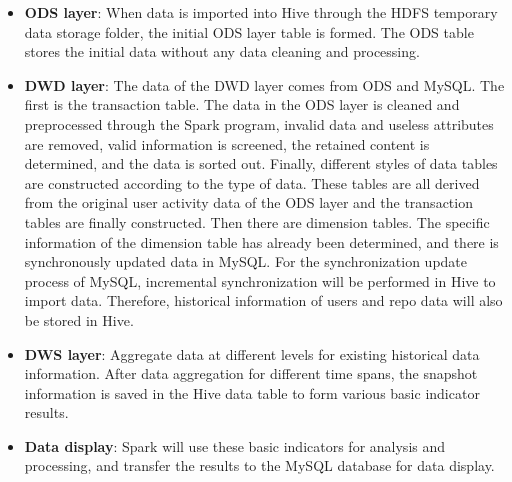 \begin{itemize}
    \item \textbf{ODS layer}: When data is imported into Hive through the HDFS temporary data storage folder, the initial ODS layer table is formed. The ODS table stores the initial data without any data cleaning and processing.
    \item \textbf{DWD layer}: The data of the DWD layer comes from ODS and MySQL. The first is the transaction table. The data in the ODS layer is cleaned and preprocessed through the Spark program, invalid data and useless attributes are removed, valid information is screened, the retained content is determined, and the data is sorted out. Finally, different styles of data tables are constructed according to the type of data. These tables are all derived from the original user activity data of the ODS layer and the transaction tables are finally constructed. Then there are dimension tables. The specific information of the dimension table has already been determined, and there is synchronously updated data in MySQL. For the synchronization update process of MySQL, incremental synchronization will be performed in Hive to import data. Therefore, historical information of users and repo data will also be stored in Hive.
    \item \textbf{DWS layer}: Aggregate data at different levels for existing historical data information. After data aggregation for different time spans, the snapshot information is saved in the Hive data table to form various basic indicator results.
    \item \textbf{Data display}: Spark will use these basic indicators for analysis and processing, and transfer the results to the MySQL database for data display.
\end{itemize}





